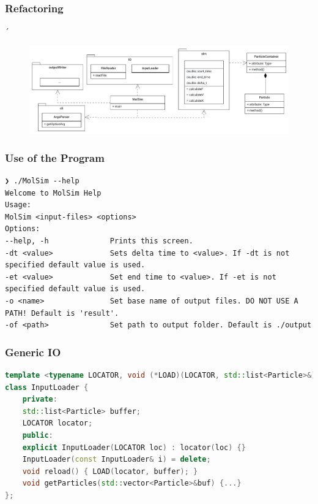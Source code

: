 
\begin{frame}
\frametitle{Refactoring}
\vspace{-0.5cm}
´\begin{figure}
	\centering
	\includegraphics[height=0.5\textheight]{UMLClassDiagram-1}
	\label{fig:umlclassdiagram-1}
\end{figure}
\end{frame}

\begin{frame}[fragile]
	\frametitle{Use of the Program}
	\vspace{0.7cm}
	\begin{Verbatim}
❯ ./MolSim --help
Welcome to MolSim Help
Usage:
MolSim <input-files> <options>
Options:
--help, -h              Prints this screen.
-dt <value>             Sets delta time to <value>. If -dt is not specified default value is used.
-et <value>             Set end time to <value>. If -et is not specified default value is used.
-o <name>               Set base name of output files. DO NOT USE A PATH! Default is 'result'.
-of <path>              Set path to output folder. Default is ./output
	\end{Verbatim}
\end{frame}

\begin{frame}[fragile]
\frametitle{Generic IO}
\vspace{0.7cm}
\begin{lstlisting}[language=C++]
template <typename LOCATOR, void (*LOAD)(LOCATOR, std::list<Particle>&)>
class InputLoader {
	private:
	std::list<Particle> buffer;
	LOCATOR locator;
	public:
	explicit InputLoader(LOCATOR loc) : locator(loc) {}
	InputLoader(const InputLoader& i) = delete;
	void reload() { LOAD(locator, buffer); }
	void getParticles(std::vector<Particle>&buf) {...}
};
\end{lstlisting}
\end{frame}

